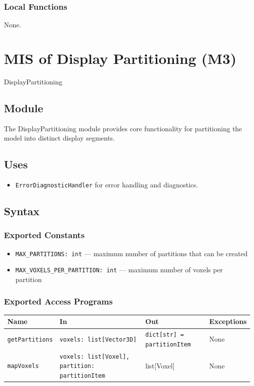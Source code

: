 \documentclass[12pt, titlepage]{article}
\begin{document}
\subsubsection{Local Functions}
None.

\section{MIS of Display Partitioning (M3)}\label{Module3} 

DisplayPartitioning

\subsection{Module}
The DisplayPartitioning module provides core functionality for partitioning the model into distinct display segments.

\subsection{Uses}
\begin{itemize}
  \item \texttt{ErrorDiagnosticHandler} for error handling and diagnostics.
\end{itemize}

\subsection{Syntax}

\subsubsection{Exported Constants}
\begin{itemize}
  \item \texttt{MAX\_PARTITIONS: int} — maximum number of partitions that can be created
  \item \texttt{MAX\_VOXELS\_PER\_PARTITION: int} — maximum number of voxels per partition
\end{itemize}

\subsubsection{Exported Access Programs}
\begin{center}
\renewcommand{\arraystretch}{1.55}
\begin{tabular}{p{4cm} p{5cm} p{3cm} p{3cm}}
\toprule
\textbf{Name} & \textbf{In} & \textbf{Out} & \textbf{Exceptions} \\
\midrule
\texttt{getPartitions} & \texttt{voxels: list[Vector3D]} & \texttt{dict[str] = partitionItem} & None \\
\texttt{mapVoxels} & \texttt{voxels: list[Voxel], \newline partition: partitionItem} & list[Voxel] & None\\
\bottomrule
\end{tabular}
\end{center}
\end{document}
